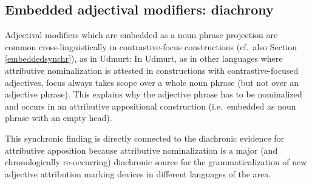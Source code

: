 \subsection{Embedded adjectival modifiers: diachrony}\label{embeddeddiachr}
Adjectival modifiers which are embedded as a noun phrase projection are common cross-linguistically in contrastive-focus constructions (cf.~also Section \ref{embeddedsynchr}), as in Udmurt:
In Udmurt, as in other languages where attributive nominalization is attested in constructions with contrastive-focused adjectives, focus  always takes scope over a whole noun phrase (but not over an adjective phrase). This explains why the adjective phrase has to be nominalized and occurs in an attributive appositional construction (i.e.~embedded as noun phrase with an empty head).


This synchronic finding is directly connected to the diachronic evidence for attributive apposition because attributive nominalization is a major (and chronologically re-occurring) diachronic source for the grammaticalization of new adjective attribution marking devices in different languages of the area.

